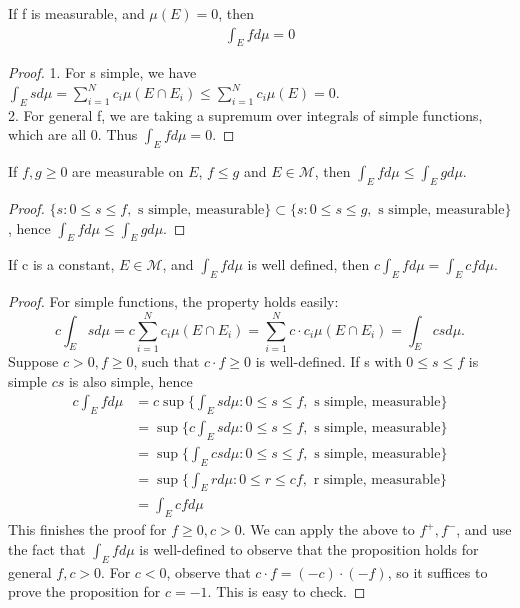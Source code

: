 \documentclass[11pt]{scrartcl}
\begin{document}
\begin{proposition}
If f is measurable, and $\mu(E)=0$, then 
\begin{align*}
\int_E f d\mu = 0 
\end{align*}
\end{proposition}

\begin{proof}
1. For s simple, we have $\int_E s d\mu = \sum_{i=1}^N c_i \mu(E\cap E_i) \leq \sum_{i=1}^N c_i \mu(E) = 0$.\\
2. For general f, we are taking a supremum over integrals of simple functions, which are all 0. Thus $\int_E f d\mu = 0 $.
\end{proof}

\begin{proposition}
If $f,g\geq 0$ are measurable on $E$, $f\leq g$ and $E\in \mathcal{M}$, then $\int_E f d\mu \leq \int_E g d\mu$.
\end{proposition}

\begin{proof}
$\{s: 0\leq s\leq f, \text{ s simple, measurable}\} \subset \{s: 0\leq s\leq g, \text{ s simple, measurable}\}$, hence $\int_E f d\mu \leq \int_E g d\mu$.
\end{proof}

\begin{proposition}
If c is a constant, $E\in \mathcal{M}$, and $\int_E f d\mu$ is well defined, then $c \int_E f d\mu = \int_E c f d\mu$.
\end{proposition}

\begin{proof}
For simple functions, the property holds easily: $$c \int_E s d\mu = c \sum_{i=1}^N c_i \mu(E\cap E_i) = \sum_{i=1}^N c\cdot c_i \mu(E\cap E_i) =\int_E c s d\mu .$$
Suppose $c > 0, f\geq 0$, such that $c\cdot f\geq 0$ is well-defined. If s with $0\leq s \leq f$ is simple $cs$ is also simple, hence
\begin{align*}
c\int_E f d\mu & = c \sup \{ \int_E s d\mu: 0\leq s\leq f, \text{ s simple, measurable}\} \\
& = \sup \{ c \int_E s d\mu: 0\leq s\leq f, \text{ s simple, measurable}\} \\
& = \sup \{ \int_E cs d\mu: 0\leq s\leq f, \text{ s simple, measurable}\} \\
& = \sup \{ \int_E r d\mu: 0\leq r\leq cf, \text{ r simple, measurable}\} \\
& = \int_E cf d\mu
\end{align*}
This finishes the proof for $f\geq 0, c>0$. We can apply the above to $f^+,f^-$, and use the fact that $\int_E f d\mu$ is well-defined to observe that the proposition holds for general $f, c>0$.
For $c<0$, observe that $c\cdot f = (-c)\cdot (-f)$, so it suffices to prove the proposition for $c = -1$. This is easy to check.
\end{proof}
\end{document}
